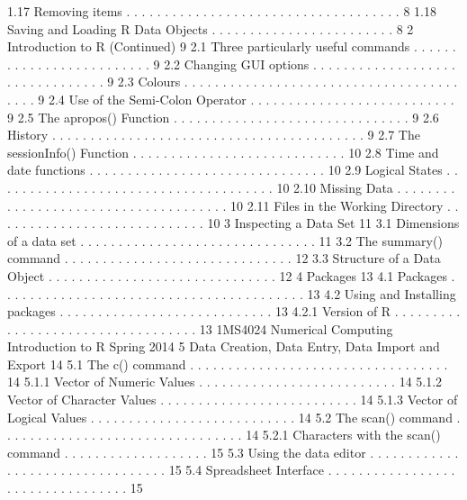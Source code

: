 \documentclass{beamer}
\begin{document}
1.17 Removing items . . . . . . . . . . . . . . . . . . . . . . . . . . . . . . . . . . . . 8
1.18 Saving and Loading R Data Objects . . . . . . . . . . . . . . . . . . . . . . . . 8
2 Introduction to R (Continued) 9
2.1 Three particularly useful commands . . . . . . . . . . . . . . . . . . . . . . . . . 9
2.2 Changing GUI options . . . . . . . . . . . . . . . . . . . . . . . . . . . . . . . . 9
2.3 Colours . . . . . . . . . . . . . . . . . . . . . . . . . . . . . . . . . . . . . . . . 9
2.4 Use of the Semi-Colon Operator . . . . . . . . . . . . . . . . . . . . . . . . . . . 9
2.5 The apropos() Function . . . . . . . . . . . . . . . . . . . . . . . . . . . . . . . 9
2.6 History . . . . . . . . . . . . . . . . . . . . . . . . . . . . . . . . . . . . . . . . . 9
2.7 The sessionInfo() Function . . . . . . . . . . . . . . . . . . . . . . . . . . . . 10
2.8 Time and date functions . . . . . . . . . . . . . . . . . . . . . . . . . . . . . . . 10
2.9 Logical States . . . . . . . . . . . . . . . . . . . . . . . . . . . . . . . . . . . . . 10
2.10 Missing Data . . . . . . . . . . . . . . . . . . . . . . . . . . . . . . . . . . . . . 10
2.11 Files in the Working Directory . . . . . . . . . . . . . . . . . . . . . . . . . . . . 10
3 Inspecting a Data Set 11
3.1 Dimensions of a data set . . . . . . . . . . . . . . . . . . . . . . . . . . . . . . . 11
3.2 The summary() command . . . . . . . . . . . . . . . . . . . . . . . . . . . . . . 12
3.3 Structure of a Data Object . . . . . . . . . . . . . . . . . . . . . . . . . . . . . . 12
4 Packages 13
4.1 Packages . . . . . . . . . . . . . . . . . . . . . . . . . . . . . . . . . . . . . . . . 13
4.2 Using and Installing packages . . . . . . . . . . . . . . . . . . . . . . . . . . . . 13
4.2.1 Version of R . . . . . . . . . . . . . . . . . . . . . . . . . . . . . . . . . . 13
1MS4024 Numerical Computing Introduction to R Spring 2014
5 Data Creation, Data Entry, Data Import and Export 14
5.1 The c() command . . . . . . . . . . . . . . . . . . . . . . . . . . . . . . . . . . 14
5.1.1 Vector of Numeric Values . . . . . . . . . . . . . . . . . . . . . . . . . . 14
5.1.2 Vector of Character Values . . . . . . . . . . . . . . . . . . . . . . . . . . 14
5.1.3 Vector of Logical Values . . . . . . . . . . . . . . . . . . . . . . . . . . . 14
5.2 The scan() command . . . . . . . . . . . . . . . . . . . . . . . . . . . . . . . . 14
5.2.1 Characters with the scan() command . . . . . . . . . . . . . . . . . . . 15
5.3 Using the data editor . . . . . . . . . . . . . . . . . . . . . . . . . . . . . . . . . 15
5.4 Spreadsheet Interface . . . . . . . . . . . . . . . . . . . . . . . . . . . . . . . . . 15
\end{document}
